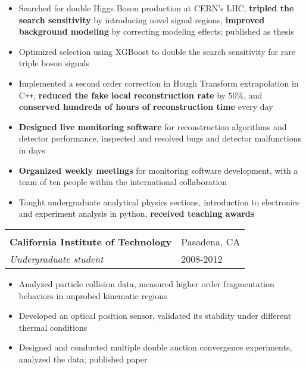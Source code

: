 \documentclass[letterpaper,11pt,oneside]{article}
\begin{document}
 \begin{flushleft}
  \begin{small}
 \begin{itemize}[leftmargin=*]
  \item Searched for double Higgs Boson production at CERN's LHC, \textbf{tripled the search sensitivity} by introducing novel signal regions, \textbf{improved background modeling} by correcting modeling effects; published as thesis
  \item Optimized selection using XGBoost to double the search sensitivity for rare triple boson signals
  \item Implemented a second order correction in Hough Transform extrapolation in C\texttt{++}, \textbf{reduced the fake local reconstruction rate} by $50\%$, and \textbf{conserved hundreds of hours of reconstruction time} every day
   \item\textbf{Designed live monitoring software} for reconstruction algorithms and detector performance, inspected and resolved bugs and detector malfunctions in days
  \item \textbf{Organized weekly meetings} for monitoring software development, with a team of ten people within the international collaboration
  \item Taught undergraduate analytical physics sections, introduction to electronics and experiment analysis in python, \textbf{received teaching awards}
 \end{itemize}
  \end{small}
 \end{flushleft}
 \begin{flushleft}
 \vspace{-0.15cm}
 \begin{tabular}{@{} l l }
    \hspace{0.8\linewidth} & \hspace{0.1\linewidth} \\
    \textbf{California Institute of Technology} & Pasadena, CA \\ 
    \textit{Undergraduate student} & 2008-2012 \\ 
 \end{tabular}
 \end{flushleft}
 \begin{flushleft}
  \begin{small}
 \begin{itemize}[leftmargin=*]
 \item Analyzed particle collision data, measured higher order fragmentation behaviors in unprobed kinematic regions
 \item Developed an optical position sensor, validated its stability under different thermal conditions
 \item Designed and conducted multiple double auction convergence experiments, analyzed the data; published paper
 \end{itemize}
  \end{small}
 \end{flushleft}
\end{document}
